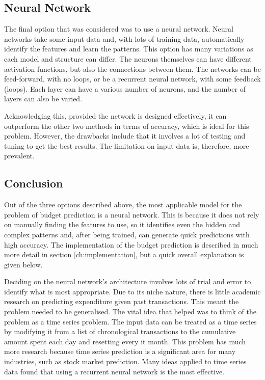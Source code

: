 \subsection{Neural Network}
The final option that was considered was to use a neural network. Neural networks take some input data and, with lots of training data, automatically identify the features and learn the patterns. This option has many variations as each model and structure can differ. The neurons themselves can have different activation functions, but also the connections between them. The networks can be feed-forward, with no loops, or be a recurrent neural network, with some feedback (loops). Each layer can have a various number of neurons, and the number of layers can also be varied.

Acknowledging this, provided the network is designed effectively, it can outperform the other two methods in terms of accuracy, which is ideal for this problem. However, the drawbacks include that it involves a lot of testing and tuning to get the best results. The limitation on input data is, therefore, more prevalent.

\subsection{Conclusion}
Out of the three options described above, the most applicable model for the problem of budget prediction is a neural network. This is because it does not rely on manually finding the features to use, so it identifies even the hidden and complex patterns and, after being trained, can generate quick predictions with high accuracy. The implementation of the budget prediction is described in much more detail in section \ref{ch:implementation}, but a quick overall explanation is given below.

Deciding on the neural network's architecture involves lots of trial and error to identify what is most appropriate. Due to its niche nature, there is little academic research on predicting expenditure given past transactions. This meant the problem needed to be generalised. The vital idea that helped was to think of the problem as a time series problem. The input data can be treated as a time series by modifying it from a list of chronological transactions to the cumulative amount spent each day and resetting every it month. This problem has much more research because time series prediction is a significant area for many industries, such as stock market prediction. Many ideas applied to time series data found that using a recurrent neural network is the most effective.
